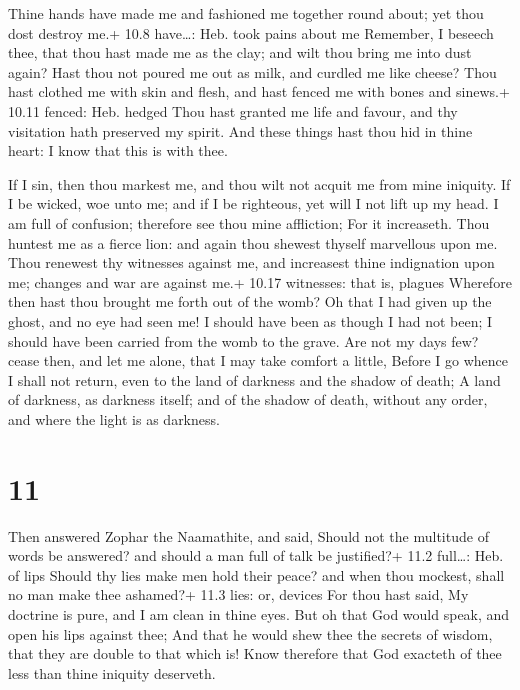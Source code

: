  Thine hands have made me and fashioned me together round
about; yet thou dost destroy me.+ 10.8 have\ldots: Heb. took pains about
me  Remember, I beseech thee, that thou hast made me as the
clay; and wilt thou bring me into dust again?  Hast thou
not poured me out as milk, and curdled me like cheese? 
Thou hast clothed me with skin and flesh, and hast fenced me with bones
and sinews.+ 10.11 fenced: Heb. hedged  Thou hast granted
me life and favour, and thy visitation hath preserved my spirit.
 And these things hast thou hid in thine heart: I know that
this is with thee.

 If I sin, then thou markest me, and thou wilt not acquit
me from mine iniquity.  If I be wicked, woe unto me; and if
I be righteous, yet will I not lift up my head. I am full of confusion;
therefore see thou mine affliction;  For it increaseth.
Thou huntest me as a fierce lion: and again thou shewest thyself
marvellous upon me.  Thou renewest thy witnesses against
me, and increasest thine indignation upon me; changes and war are
against me.+ 10.17 witnesses: that is, plagues  Wherefore
then hast thou brought me forth out of the womb? Oh that I had given up
the ghost, and no eye had seen me!  I should have been as
though I had not been; I should have been carried from the womb to the
grave.  Are not my days few? cease then, and let me alone,
that I may take comfort a little,  Before I go whence I
shall not return, even to the land of darkness and the shadow of death;
 A land of darkness, as darkness itself; and of the shadow
of death, without any order, and where the light is as darkness.

\hypertarget{section-10}{%
\section{11}\label{section-10}}

 Then answered Zophar the Naamathite, and said, 
Should not the multitude of words be answered? and should a man full of
talk be justified?+ 11.2 full\ldots: Heb. of lips  Should
thy lies make men hold their peace? and when thou mockest, shall no man
make thee ashamed?+ 11.3 lies: or, devices  For thou hast
said, My doctrine is pure, and I am clean in thine eyes. 
But oh that God would speak, and open his lips against thee;
 And that he would shew thee the secrets of wisdom, that
they are double to that which is! Know therefore that God exacteth of
thee less than thine iniquity deserveth.


